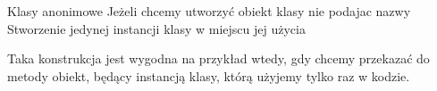 Klasy anonimowe
Jeżeli chcemy utworzyć obiekt klasy nie podajac nazwy
Stworzenie jedynej instancji klasy w miejscu jej użycia


Taka konstrukcja jest wygodna na przykład wtedy, gdy chcemy przekazać do metody obiekt, będący instancją klasy, którą użyjemy tylko raz w kodzie.
